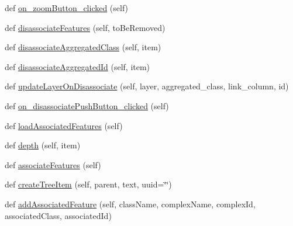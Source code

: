 \begin{DoxyCompactItemize}
def \mbox{\hyperlink{class_dsg_tools_1_1_complex_tools_1_1complex_window_1_1_complex_window_a7a1f50dd24e8787d4f355318159d2183}{on\+\_\+zoom\+Button\+\_\+clicked}} (self)
\item 
def \mbox{\hyperlink{class_dsg_tools_1_1_complex_tools_1_1complex_window_1_1_complex_window_a3efb68c68cbf91f00a3432f53e965d2b}{disassociate\+Features}} (self, to\+Be\+Removed)
\item 
def \mbox{\hyperlink{class_dsg_tools_1_1_complex_tools_1_1complex_window_1_1_complex_window_a7303c98e007e37e70497c56e877487c6}{disassociate\+Aggregated\+Class}} (self, item)
\item 
def \mbox{\hyperlink{class_dsg_tools_1_1_complex_tools_1_1complex_window_1_1_complex_window_a368acb25b3069036d4970c74c8123c6f}{disassociate\+Aggregated\+Id}} (self, item)
\item 
def \mbox{\hyperlink{class_dsg_tools_1_1_complex_tools_1_1complex_window_1_1_complex_window_a20403af8761555d878ff79ee16a398eb}{update\+Layer\+On\+Disassociate}} (self, layer, aggregated\+\_\+class, link\+\_\+column, id)
\item 
def \mbox{\hyperlink{class_dsg_tools_1_1_complex_tools_1_1complex_window_1_1_complex_window_ad92dd4f252e46de62faa10df84639819}{on\+\_\+disassociate\+Push\+Button\+\_\+clicked}} (self)
\item 
def \mbox{\hyperlink{class_dsg_tools_1_1_complex_tools_1_1complex_window_1_1_complex_window_adb4536abecc18bd3ed9915d879a72337}{load\+Associated\+Features}} (self)
\item 
def \mbox{\hyperlink{class_dsg_tools_1_1_complex_tools_1_1complex_window_1_1_complex_window_ab97194d04bc78eb3536f4c5c8325cbe1}{depth}} (self, item)
\item 
def \mbox{\hyperlink{class_dsg_tools_1_1_complex_tools_1_1complex_window_1_1_complex_window_ad3f85f69aac90814bff6d8c3bf08d3f0}{associate\+Features}} (self)
\item 
def \mbox{\hyperlink{class_dsg_tools_1_1_complex_tools_1_1complex_window_1_1_complex_window_a3404a1ab1ce3eeb54abf660981d37ba7}{create\+Tree\+Item}} (self, parent, text, uuid=\char`\"{}\char`\"{})
\item 
def \mbox{\hyperlink{class_dsg_tools_1_1_complex_tools_1_1complex_window_1_1_complex_window_a4f094ed4f9f97ce5e04041e2a84487b2}{add\+Associated\+Feature}} (self, class\+Name, complex\+Name, complex\+Id, associated\+Class, associated\+Id)
\end{DoxyCompactItemize}
